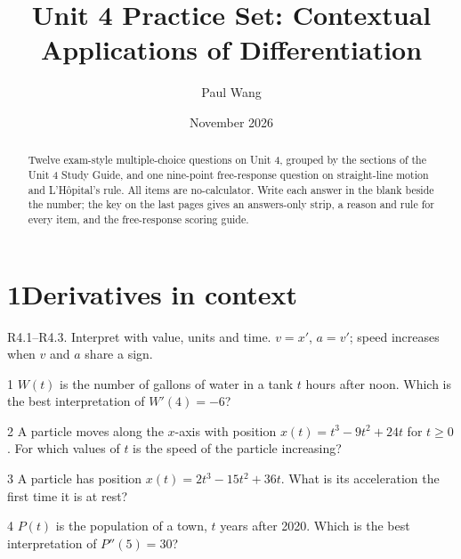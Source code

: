 \documentclass{apcalc}
\title{Unit 4 Practice Set: Contextual Applications of Differentiation}
\author{Paul Wang}
\date{November 2026}
\begin{document}
\maketitle
\begin{abstract}
Twelve exam-style multiple-choice questions on Unit 4, grouped by the sections of the Unit 4 Study Guide, and one nine-point free-response question on straight-line motion and L'Hôpital's rule. All items are no-calculator. Write each answer in the blank beside the number; the key on the last pages gives an answers-only strip, a reason and rule for every item, and the free-response scoring guide.
\end{abstract}
\section*{1\quad Derivatives in context}
\begin{setrule}R4.1–R4.3. Interpret with value, units and time. $v=x'$, $a=v'$; speed increases when $v$ and $a$ share a sign.\end{setrule}
\begin{q}{1}
$W(t)$ is the number of gallons of water in a tank $t$ hours after noon. Which is the best interpretation of $W'(4)=-6$?
\end{q}
\begin{q}{2}
A particle moves along the $x$-axis with position $x(t)=t^3-9t^2+24t$ for $t\ge0$. For which values of $t$ is the speed of the particle increasing?
\end{q}
\begin{q}{3}
A particle has position $x(t)=2t^3-15t^2+36t$. What is its acceleration the first time it is at rest?
\end{q}
\begin{q}{4}
$P(t)$ is the population of a town, $t$ years after 2020. Which is the best interpretation of $P''(5)=30$?
\end{q}
\end{document}
